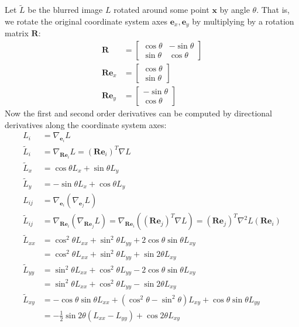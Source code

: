 \documentclass[thesis.tex]{subfiles}
\begin{document}
Let $\widetilde{L}$ be the blurred image $L$ rotated around some point $\mathbf{x}$ by angle $\theta$. That is, we rotate the original coordinate system axes $\mathbf{e}_x, \mathbf{e}_y$ by multiplying by a rotation matrix $\mathbf{R}$:
%
\begin{align*}
\mathbf{R} &= \begin{bmatrix}
\cos \theta & -\sin \theta \\
\sin \theta & \cos \theta
\end{bmatrix} \\
\mathbf{Re}_x &= \begin{bmatrix}
\cos \theta \\ \sin \theta
\end{bmatrix} \\
\mathbf{Re}_y &= \begin{bmatrix}
-\sin \theta \\ \cos \theta
\end{bmatrix}
\end{align*}
%
Now the first and second order derivatives can be computed by directional derivatives along the coordinate system axes:
%
\begin{align*}
L_i &= \nabla_{\mathbf{e}_i} L \\
\widetilde{L}_i &= \nabla_{\mathbf{Re}_i} L = (\mathbf{Re}_i)^T \nabla L \\
\widetilde{L}_x &= \cos \theta L_x + \sin \theta L_y \\
\widetilde{L}_y &= -\sin \theta L_x + \cos \theta L_y \\
L_{ij} &= \nabla_{\mathbf{e}_i} (\nabla_{\mathbf{e}_j} L) \\
\widetilde{L}_{ij} &= \nabla_{\mathbf{Re}_i} (\nabla_{\mathbf{Re}_j} L)
= \nabla_{\mathbf{Re}_i} \left( (\mathbf{Re}_j)^T \nabla L \right)
= (\mathbf{Re}_j)^T \nabla^2 L (\mathbf{Re}_i) \\
\widetilde{L}_{xx} &= \cos^2 \theta L_{xx} + \sin^2 \theta L_{yy} + 2 \cos \theta \sin \theta L_{xy} \\
&= \cos^2 \theta L_{xx} + \sin^2 \theta L_{yy} + \sin 2\theta L_{xy} \\
\widetilde{L}_{yy} &= \sin^2 \theta L_{xx} + \cos^2 \theta L_{yy} - 2 \cos \theta \sin \theta L_{xy} \\
&= \sin^2 \theta L_{xx} + \cos^2 \theta L_{yy} - \sin 2\theta L_{xy} \\
\widetilde{L}_{xy} &= -\cos \theta \sin \theta L_{xx} + (\cos^2 \theta - \sin^2 \theta) L_{xy} + \cos \theta \sin \theta L_{yy} \\
&= -\frac12 \sin 2\theta (L_{xx} - L_{yy}) + \cos 2\theta L_{xy}
\end{align*}
%
\end{document}
